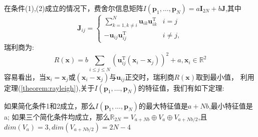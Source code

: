 在条件(1),(2)成立的情况下，费舍尔信息矩阵$I(\bm{p}_1,\dots,\bm{p}_N)=a\bm{I}_{2N}+b\bm{J}$,其中
\[\bm{J}_{ij}=\begin{cases}
\sum_{k=1,k\neq i}^N \bm{u}_{ik}\bm{u}_{ik}^{\textrm{T}} &i=j\\
-\bm{u}_{ij}\bm{u}_{ij}^{\textrm{T}} &i\neq j,
\end{cases}
\]瑞利商为:
\begin{equation}
R(\bm{x})=b\sum_{i\leq j\leq N} (\bm{u}_{ij}^{\textrm{T}} (\bm{x}_i-\bm{x}_j))^2+a,\bm{x}_i\in \mathbb{R}^2
\end{equation}
容易看出，当$\bm{x}_i=\bm{x}_j$或$(\bm{x}_i-\bm{x}_j)$与$\bm{u}_{ij}$正交时，瑞利商$R(\bm{x})$取到最小值，
利用定理(\ref{theorem:rayleigh}),关于$I(\bm{p}_1,\dots,\bm{p}_N)$的特征值，我们有如下定理:
\begin{theorem}
如果简化条件1和2成立，那么$I(\bm{p}_1,\dots,\bm{p}_N)$的最大特征值是$a+Nb$,最小特征值是a;
如果三个简化条件均成立，那么$\mathbb{R}_{2N}=V_{a+Nb}\oplus V_a\oplus V_{a+Nb/2}$,且$dim(V_a)=3,dim(V_{a+Nb/2})=2N-4$
\end{theorem}
